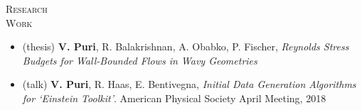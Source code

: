 \documentclass[10pt]{article}
\begin{document}
\vspace{-1.5em}
\begin{multicols}{2}
\textsc{\small Research \\ Work}
\columnbreak

\vspace{-1.75em}
\begin{itemize}[label= ]
    \setlength{\itemindent}{-2.5em}
    \setlength\itemsep{-1.0\itemsep}
    \item (thesis) \textbf{V. Puri}, R. Balakrishnan, A. Obabko, P. Fischer, {\sl Reynolds Stress Budgets for Wall-Bounded Flows in Wavy Geometries} 
    \item (talk) \textbf{V. Puri}, R. Haas, E. Bentivegna, {\sl Initial Data Generation Algorithms for `Einstein Toolkit'}. American Physical Society April Meeting, 2018
\end{itemize}
\vspace{-2.0em}

\end{multicols}
\vspace{-1.5em}
\end{document}
